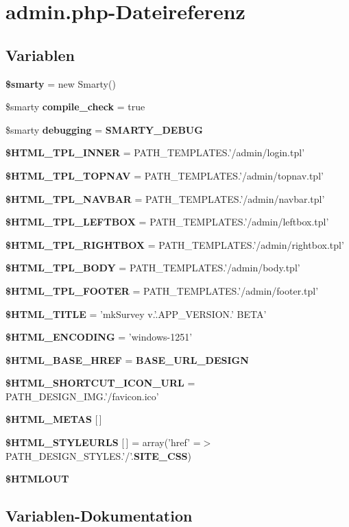 \section{admin.php-Dateireferenz}
\label{admin_8php}
\subsection*{Variablen}
\begin{CompactItemize}
\item 
{\bf \$smarty} = new Smarty()
\item 
\$smarty {\bf compile\_\-check} = true
\item 
\$smarty {\bf debugging} = {\bf SMARTY\_\-DEBUG}
\item 
{\bf \$HTML\_\-TPL\_\-INNER} = PATH\_\-TEMPLATES.'/admin/login.tpl'
\item 
{\bf \$HTML\_\-TPL\_\-TOPNAV} = PATH\_\-TEMPLATES.'/admin/topnav.tpl'
\item 
{\bf \$HTML\_\-TPL\_\-NAVBAR} = PATH\_\-TEMPLATES.'/admin/navbar.tpl'
\item 
{\bf \$HTML\_\-TPL\_\-LEFTBOX} = PATH\_\-TEMPLATES.'/admin/leftbox.tpl'
\item 
{\bf \$HTML\_\-TPL\_\-RIGHTBOX} = PATH\_\-TEMPLATES.'/admin/rightbox.tpl'
\item 
{\bf \$HTML\_\-TPL\_\-BODY} = PATH\_\-TEMPLATES.'/admin/body.tpl'
\item 
{\bf \$HTML\_\-TPL\_\-FOOTER} = PATH\_\-TEMPLATES.'/admin/footer.tpl'
\item 
{\bf \$HTML\_\-TITLE} = 'mkSurvey v.'.APP\_\-VERSION.' BETA'
\item 
{\bf \$HTML\_\-ENCODING} = 'windows-1251'
\item 
{\bf \$HTML\_\-BASE\_\-HREF} = {\bf BASE\_\-URL\_\-DESIGN}
\item 
{\bf \$HTML\_\-SHORTCUT\_\-ICON\_\-URL} = PATH\_\-DESIGN\_\-IMG.'/favicon.ico'
\item 
{\bf \$HTML\_\-METAS} [$\,$]
\item 
{\bf \$HTML\_\-STYLEURLS} [$\,$] = array('href' =$>$ PATH\_\-DESIGN\_\-STYLES.'/'.{\bf SITE\_\-CSS})
\item 
{\bf \$HTMLOUT}
\end{CompactItemize}


\subsection{Variablen-Dokumentation}
